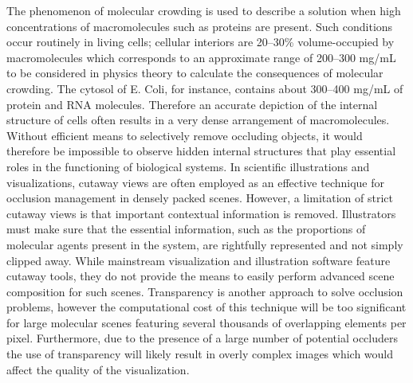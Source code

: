 The phenomenon of molecular crowding is used to describe a solution when high concentrations of macromolecules such as proteins are present.
Such conditions occur routinely in living cells; cellular interiors are 20–30\% volume-occupied by macromolecules which corresponds to an approximate range of 200–300 mg/mL to be considered in physics theory to calculate the consequences of molecular crowding.
The cytosol of E. Coli, for instance, contains about 300–400 mg/mL of protein and RNA molecules.
Therefore an accurate depiction of the internal structure of cells often results in a very dense arrangement of macromolecules. %
Without efficient means to selectively remove occluding objects, it would therefore be impossible to observe hidden internal structures that play essential roles in the functioning of biological systems.
In scientific illustrations and visualizations, cutaway views are often employed as an effective technique for occlusion management in densely packed scenes.
However, a limitation of strict cutaway views is that important contextual information is removed.
Illustrators must make sure that the essential information, such as the proportions of molecular agents present in the system, are rightfully represented and not simply clipped away.
While mainstream visualization and illustration software feature cutaway tools, they do not provide the means to easily perform advanced scene composition for such scenes.
Transparency is another approach to solve occlusion problems, however the computational cost of this technique will be too significant for large molecular scenes featuring several thousands of overlapping elements per pixel.
Furthermore, due to the presence of a large number of potential occluders the use of transparency will likely result in overly complex images which would affect the quality of the visualization.



